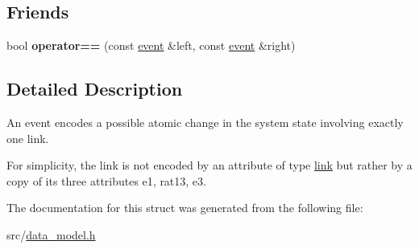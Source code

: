 \subsection*{Friends}
\begin{DoxyCompactItemize}
\item 
\mbox{\label{structtricl_1_1event_a3dd0c9c41d63a2d2171cffc7dfa14d6c}} 
bool {\bfseries operator==} (const \hyperlink{structtricl_1_1event}{event} \&left, const \hyperlink{structtricl_1_1event}{event} \&right)
\end{DoxyCompactItemize}


\subsection{Detailed Description}
An event encodes a possible atomic change in the system state involving exactly one link. 

For simplicity, the link is not encoded by an attribute of type \hyperlink{structtricl_1_1link}{link} but rather by a copy of its three attributes e1, rat13, e3. 

The documentation for this struct was generated from the following file\+:\begin{DoxyCompactItemize}
\item 
src/\hyperlink{data__model_8h}{data\+\_\+model.\+h}\end{DoxyCompactItemize}
